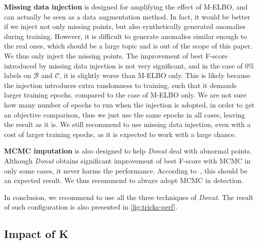 \documentclass[sigconf]{acmart}
\newcommand\compactvspace[1]{\vspace{#1}}
\newcommand\compactvspace[1]{}
\newcommand{\DONUT}{\textit{Donut}}
\newcommand{\DATASETB}{$\mathcal{B}$}
\newcommand{\DATASETC}{$\mathcal{C}$}
\begin{document}
\textbf{Missing data injection} is designed for amplifying the effect of M-ELBO, and can actually be seen as a data augmentation method.
In fact, it would be better if we inject not only missing points, but also synthetically generated anomalies during training.
However, it is difficult to generate anomalies similar enough to the real ones, which should be a large topic and is out of the scope of this paper.
We thus only inject the missing points.
The improvement of best F-score introduced by missing data injection is not very significant, and in the case of 0\% labels on \DATASETB{} and \DATASETC{}, it is slightly worse than M-ELBO only.
This is likely because the injection introduces extra randomness to training, such that it demands larger training epochs, compared to the case of M-ELBO only.
We are not sure how many number of epochs to run when the injection is adopted, in order to get an objective comparison, thus we just use the same epochs in all cases, leaving the result as it is.
We still recommend to use missing data injection, even with a cost of larger training epochs, as it is expected to work with a large chance.

\textbf{MCMC imputation} is also designed to help \DONUT{} deal with abnormal points.
Although \DONUT{} obtains significant improvement of best F-score with MCMC in only some cases, it never harms the performance.
According to~\cite{rezende_stochastic_2014}, this should be an expected result.
We thus recommend to always adopt MCMC in detection.

In conclusion, we recommend to use all the three techniques of \DONUT{}.
The result of such configuration is also presented in \cref{fig:tricks-perf}.


%
%
\compactvspace{-1em}
\subsection{Impact of K}
\label{sec:impact-of-k}
\end{document}
